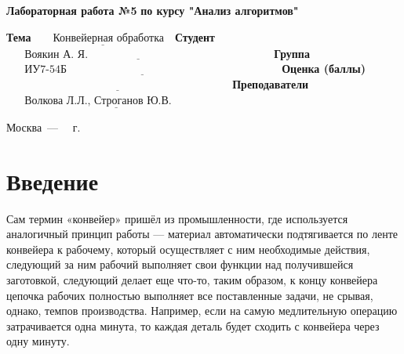 \documentclass[12pt, a4paper]{report}
\begin{document}
\begin{titlepage}
		
		\begin{center}
			\Large\textbf{Лабораторная работа №5}\newline
			\Large\textbf{по курсу "Анализ алгоритмов"}\newline
		\end{center}
	
		\noindent\textbf{Тема} $\underline{\text{~~~~~Конвейерная обработка~~}}$\newline\newline\newline
		\noindent\textbf{Студент} $\underline{\text{~~~~~Воякин А. Я.~~~~~~~~~~~~~~~~~~~~~~~~~~~~~~~~~~~~~~~~~~~~~~~~~~}}$\newline\newline
		\noindent\textbf{Группа} $\underline{\text{~~~~~ИУ7-54Б~~~~~~~~~~~~~~~~~~~~~~~~~~~~~~~~~~~~~~~~~~~~~~~~~~~~~~~~~~}}$\newline\newline
		\noindent\textbf{Оценка (баллы)} $\underline{\text{~~~~~~~~~~~~~~~~~~~~~~~~~~~~~~~~~~~~~~~~~~~~~~~~~~~~~~~~~~~~~}}$\newline\newline
		\noindent\textbf{Преподаватели} $\underline{\text{~~~~~Волкова Л.Л., Строганов Ю.В.~~~~~~~~~~~~~~~}}$\newline
		
		\begin{center}
			\vfill
			Москва~---~\the\year
			~г.
		\end{center}
	\restoregeometry
	\end{titlepage}
	
	\tableofcontents

	\chapter*{Введение}
	\hspace{0.5cm}Сам термин «конвейер» пришёл из промышленности, где используется аналогичный принцип работы — материал автоматически подтягивается по ленте конвейера к рабочему, который осуществляет с ним необходимые действия, следующий за ним рабочий выполняет свои функции над получившейся заготовкой, следующий делает еще что-то, таким образом, к концу конвейера цепочка рабочих полностью выполняет все поставленные задачи, не срывая, однако, темпов производства. Например, если на самую медлительную операцию затрачивается одна минута, то каждая деталь будет сходить с конвейера через одну минуту.
	
\end{document}
